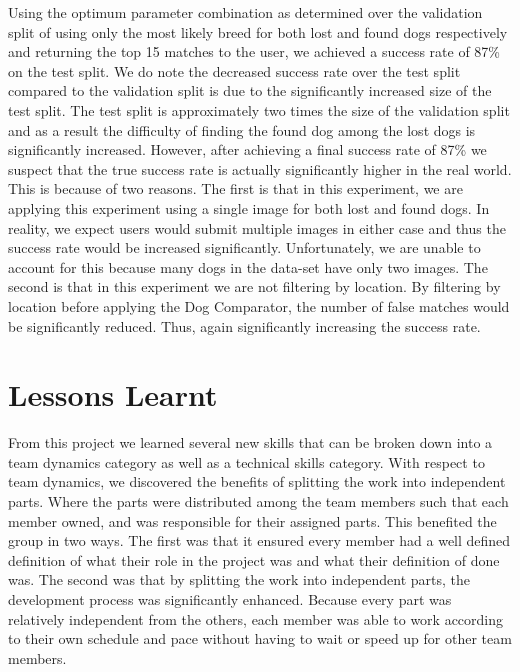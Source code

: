 \documentclass{article}
\begin{document}
Using the optimum parameter combination as determined over the validation split of using only the most likely breed for both lost and found dogs respectively and returning the top 15 matches to the user, we achieved a success rate of 87\% on the test split.  We do note the decreased success rate over the test split compared to the validation split is due to the significantly increased size of the test split.  The test split is approximately two times the size of the validation split and as a result the difficulty of finding the found dog among the lost dogs is significantly increased.  However, after achieving a final success rate of 87\% we suspect that the true success rate is actually significantly higher in the real world.  This is because of two reasons.  The first is that in this experiment, we are applying this experiment using a single image for both lost and found dogs.  In reality, we expect users would submit multiple images in either case and thus the success rate would be increased significantly.  Unfortunately, we are unable to account for this because many dogs in the data-set have only two images.  The second is that in this experiment we are not filtering by location.  By filtering by location before applying the Dog Comparator, the number of false matches would be significantly reduced.  Thus, again significantly increasing the success rate.

\newpage

\section{Lessons Learnt}
From this project we learned several new skills that can be broken down into a team dynamics category as well as a technical skills category.  With respect to team dynamics, we discovered the benefits of splitting the work into independent parts.  Where the parts were distributed among the team members such that each member owned, and was responsible for their assigned parts.  This benefited the group in two ways.  The first was that it ensured every member had a well defined definition of what their role in the project was and what their definition of done was.  The second was that by splitting the work into independent parts, the development process was significantly enhanced.  Because every part was relatively independent from the others, each member was able to work according to their own schedule and pace without having to wait or speed up for other team members.  
\end{document}
